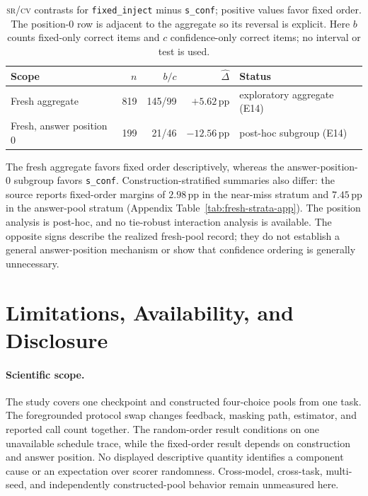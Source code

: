 \documentclass{article}
\newcommand{\sconf}{\texttt{s\_conf}}
\newcommand{\finj}{\texttt{fixed\_inject}}
\newcommand{\pp}{\,\mathrm{pp}}
\newcommand{\srcv}{\textsc{sr/cv}}
\begin{document}
\begin{table}[H]
\centering
\small
\setlength{\tabcolsep}{3.7pt}
\caption{\srcv{} contrasts for \finj{} minus \sconf{}; positive values favor
fixed order.  The position-0 row is adjacent to the aggregate so its reversal
is explicit.  Here $b$ counts fixed-only correct items and $c$ confidence-only
correct items; no interval or test is used.}
\label{tab:fixed-order}
\begin{tabular}{@{}lrrrl@{}}
\toprule
Scope & $n$ & $b/c$ & $\widehat\Delta$ & Status \\
\midrule
Fresh aggregate & 819 & 145/99 & $+5.62\pp$ & exploratory aggregate (E14) \\
Fresh, answer position 0 & 199 & 21/46 & $-12.56\pp$ & post-hoc subgroup (E14) \\
\bottomrule
\end{tabular}
\end{table}

The fresh aggregate favors fixed order descriptively, whereas the
answer-position-0 subgroup favors \sconf{}.  Construction-stratified summaries
also differ: the source reports fixed-order margins of $2.98\pp$ in the
near-miss stratum and $7.45\pp$ in the answer-pool stratum (Appendix
Table~\ref{tab:fresh-strata-app}).  The position analysis is post-hoc, and no
tie-robust interaction analysis is available.  The opposite signs describe
the realized fresh-pool record; they do not establish a general answer-position
mechanism or show that confidence ordering is generally unnecessary.

\section{Limitations, Availability, and Disclosure}
\label{sec:limitations}

\paragraph{Scientific scope.}
The study covers one checkpoint and constructed four-choice pools from one
task.  The foregrounded protocol swap changes feedback, masking path,
estimator, and reported
call count together.  The random-order result conditions on one unavailable
schedule trace, while the fixed-order result depends on construction and
answer position.  No displayed descriptive quantity identifies a component
cause or an expectation over scorer randomness.  Cross-model, cross-task,
multi-seed, and independently constructed-pool behavior remain unmeasured
here.
\end{document}
